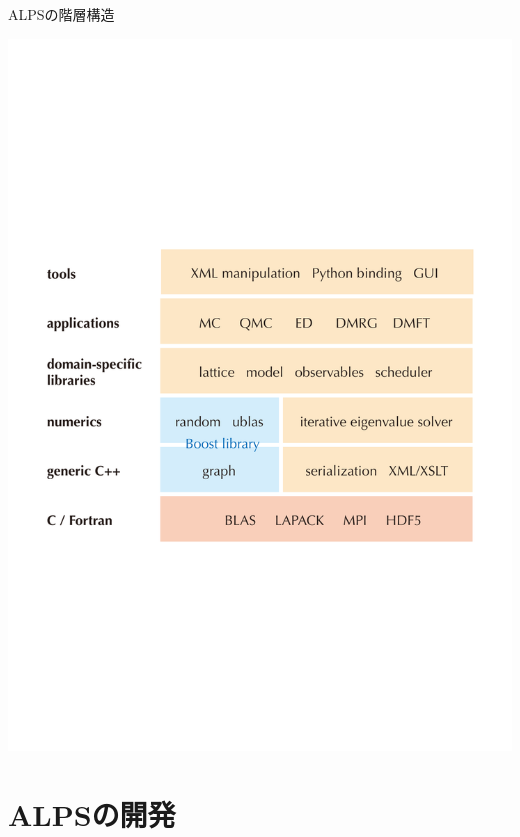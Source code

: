 \begin{frame}{ALPSの階層構造}
  \begin{center}
    \includegraphics[height=0.65\textheight]{hierarchy.pdf}
  \end{center}
\end{frame}

\section{ALPSの開発}

